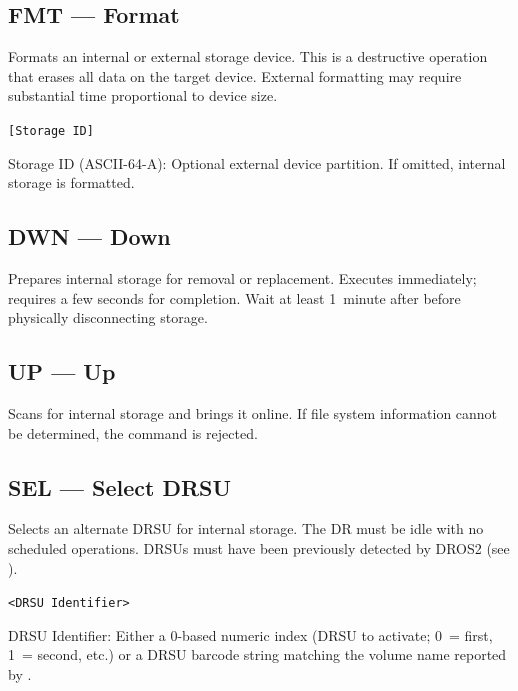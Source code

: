 \subsection{FMT --- Format}
\label{cmd:fmt}
\begin{description}[style=nextline]
    \item[Description:]
        Formats an internal or external storage device.  This is a destructive
        operation that erases all data on the target device.  External
        formatting may require substantial time proportional to device size.
    \item[Argument Format:] \texttt{[Storage ID]}
    \item[Argument:]
        Storage ID (ASCII-64-A): Optional external device partition.
        If omitted, internal storage is formatted.
\end{description}

\subsection{DWN --- Down}
\label{cmd:dwn}
\begin{description}[style=nextline]
    \item[Description:]
        Prepares internal storage for removal or replacement.  Executes
        immediately; requires a few seconds for completion.  Wait at least
        1~minute after  before physically disconnecting storage.
\end{description}

\subsection{UP --- Up}
\label{cmd:up}
\begin{description}[style=nextline]
    \item[Description:]
        Scans for internal storage and brings it online.  If file system
        information cannot be determined, the command is rejected.
\end{description}

\subsection{SEL --- Select DRSU}
\label{cmd:sel}
\begin{description}[style=nextline]
    \item[Description:]
        Selects an alternate DRSU for internal storage.  The DR must be idle
        with no scheduled operations.  DRSUs must have been previously detected
        by DROS2 (see ).
    \item[Argument Format:] \texttt{<DRSU Identifier>}
    \item[Argument:]
        DRSU Identifier: Either a 0-based numeric index (DRSU to activate;
        0~= first, 1~= second, etc.) or a DRSU barcode string matching the
        volume name reported by .
\end{description}

